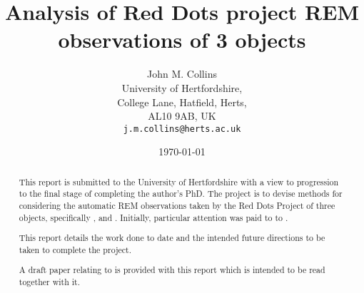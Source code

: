 \title{Analysis of Red Dots project REM observations of 3 {\rdwarf} objects}

\author{John M. Collins\\
  University of Hertfordshire,\\
  College Lane, Hatfield, Herts, \\
  AL10 9AB, UK\\
  \texttt{j.m.collins@herts.ac.uk}\\
  }
\engwithth
\date{\today}
\maketitle

\protect\label{firstpage}

\begin{abstract}

  This report is submitted to the University of Hertfordshire with a
  view to progression to the final stage of completing the author's
  PhD. The project is to devise methods for considering the automatic REM
  observations taken by the Red Dots Project of three {\rdwarf} objects,
  specifically \prox, {\bstar} and \ross. Initially, particular attention was
  paid to to \ross.
  
  This report details the work done to date and the intended future directions
  to be taken to complete the project.
  
  A draft paper relating to {\ross} is provided with this report which is
  intended to be read together with it.
  
  
\end{abstract}

